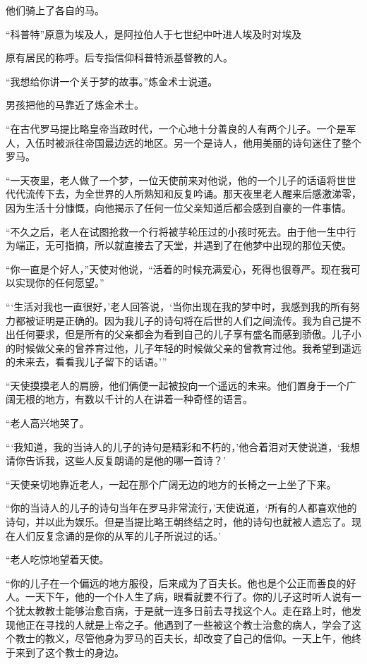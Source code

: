 \documentclass[twoside,openany]{book}
\begin{document}
他们骑上了各自的马。

“科普特”原意为埃及人，是阿拉伯人于七世纪中叶进人埃及时对埃及

原有居民的称呼。后专指信仰科普特派基督教的人。

“我想给你讲一个关于梦的故事。”炼金术士说道。

男孩把他的马靠近了炼金术士。

“在古代罗马提比略皇帝当政时代，一个心地十分善良的人有两个儿子。一个是军人，入伍时被派往帝国最边远的地区。另一个是诗人，他用美丽的诗句迷住了整个罗马。

“一天夜里，老人做了一个梦，一位天使前来对他说，他的一个儿子的话语将世世代代流传下去，为全世界的人所熟知和反复吟诵。那天夜里老人醒来后感激涕零，因为生活十分慷慨，向他揭示了任何一位父亲知道后都会感到自豪的一件事情。

“不久之后，老人在试图抢救一个行将被芋轮压过的小孩时死去。由于他一生中行为端正，无可指摘，所以就直接去了天堂，并遇到了在他梦中出现的那位天使。

“你一直是个好人，”天使对他说，“活着的时候充满爱心，死得也很尊严。现在我可以实现你的任何愿望。”

“‘生活对我也一直很好，'老人回答说，‘当你出现在我的梦中时，我感到我的所有努力都被证明是正确的。因为我儿子的诗句将在后世的人们之间流传。我为自己提不出任何要求，但是所有的父亲都会为看到自己的儿子享有盛名而感到骄傲。儿子小的时候做父亲的曾养育过他，儿子年轻的时候做父亲的曾教育过他。我希望到遥远的未来去，看看我儿子留下的话语。’”

“天使摸摸老人的肩膀，他们俩便一起被投向一个遥远的未来。他们置身于一个广阔无根的地方，有数以千计的人在讲着一种奇怪的语言。

“老人高兴地哭了。

“‘我知道，我的当诗人的儿子的诗句是精彩和不朽的，'他合着泪对天使说道，‘我想请你告诉我，这些人反复朗诵的是他的哪一首诗？’

“天使亲切地靠近老人，一起在那个广阔无边的地方的长椅之一上坐了下来。

“你的当诗人的儿子的诗句当年在罗马非常流行，'天使说道，‘所有的人都喜欢他的诗句，并以此为娱乐。但是当提比略王朝终结之时，他的诗句也就被人遗忘了。现在人们反复念诵的是你的从军的儿子所说过的话。'

“老人吃惊地望着天使。

“你的儿子在一个偏远的地方服役，后来成为了百夫长。他也是个公正而善良的好人。一天下午，他的一个仆人生了病，眼看就要不行了。你的儿子这时听人说有一个犹太教教士能够治愈百病，于是就一连多日前去寻找这个人。走在路上时，他发现他正在寻找的人就是上帝之子。他遇到了一些被这个教士治愈的病人，学会了这个教士的教义，尽管他身为罗马的百夫长，却改变了自己的信仰。一天上午，他终于来到了这个教士的身边。
\end{document}

